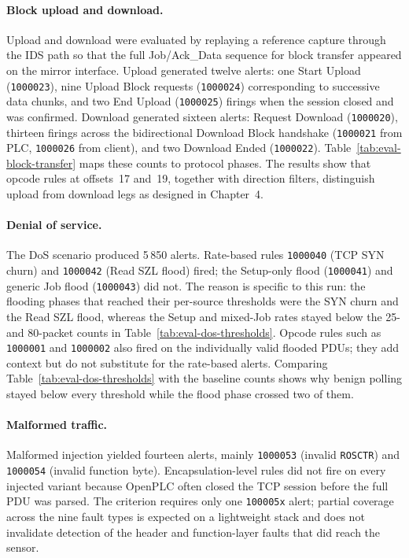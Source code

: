 \documentclass[../main.tex]{subfiles}
\begin{document}
\paragraph{Block upload and download.}
Upload and download were evaluated by replaying a reference capture through the IDS path so that the full Job/Ack\_Data sequence for block transfer appeared on the mirror interface. Upload generated twelve alerts: one Start Upload (\texttt{1000023}), nine Upload Block requests (\texttt{1000024}) corresponding to successive data chunks, and two End Upload (\texttt{1000025}) firings when the session closed and was confirmed. Download generated sixteen alerts: Request Download (\texttt{1000020}), thirteen firings across the bidirectional Download Block handshake (\texttt{1000021} from PLC, \texttt{1000026} from client), and two Download Ended (\texttt{1000022}). Table~\ref{tab:eval-block-transfer} maps these counts to protocol phases. The results show that opcode rules at offsets~17 and~19, together with direction filters, distinguish upload from download legs as designed in Chapter~4.

\paragraph{Denial of service.}
The DoS scenario produced 5\,850 alerts. Rate-based rules \texttt{1000040} (TCP SYN churn) and \texttt{1000042} (Read SZL flood) fired; the Setup-only flood (\texttt{1000041}) and generic Job flood (\texttt{1000043}) did not. The reason is specific to this run: the flooding phases that reached their per-source thresholds were the SYN churn and the Read SZL flood, whereas the Setup and mixed-Job rates stayed below the 25- and 80-packet counts in Table~\ref{tab:eval-dos-thresholds}. Opcode rules such as \texttt{1000001} and \texttt{1000002} also fired on the individually valid flooded PDUs; they add context but do not substitute for the rate-based alerts. Comparing Table~\ref{tab:eval-dos-thresholds} with the baseline counts shows why benign polling stayed below every threshold while the flood phase crossed two of them.

\paragraph{Malformed traffic.}
\label{sec:eval-malformed}
Malformed injection yielded fourteen alerts, mainly \texttt{1000053} (invalid \texttt{ROSCTR}) and \texttt{1000054} (invalid function byte). Encapsulation-level rules did not fire on every injected variant because OpenPLC often closed the TCP session before the full PDU was parsed. The criterion requires only one \texttt{100005x} alert; partial coverage across the nine fault types is expected on a lightweight stack and does not invalidate detection of the header and function-layer faults that did reach the sensor.
\end{document}

